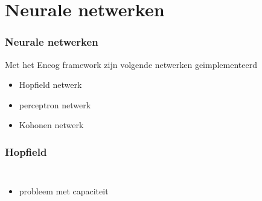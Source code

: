 \documentclass{beamer}
\begin{document}
\section{Neurale netwerken}
\begin{frame}
  \frametitle{Neurale netwerken}
  Met het Encog framework zijn volgende netwerken ge\"{i}mplementeerd
  \begin{itemize}
    \item Hopfield netwerk
    \item perceptron netwerk
    \item Kohonen netwerk
  \end{itemize}
\end{frame}
\begin{frame}
  \frametitle{Hopfield}
  \begin{columns}[c]
       \begin{itemize}
         \item probleem met capaciteit
       \end{itemize}
  \end{columns}
\end{frame}
\end{document}
